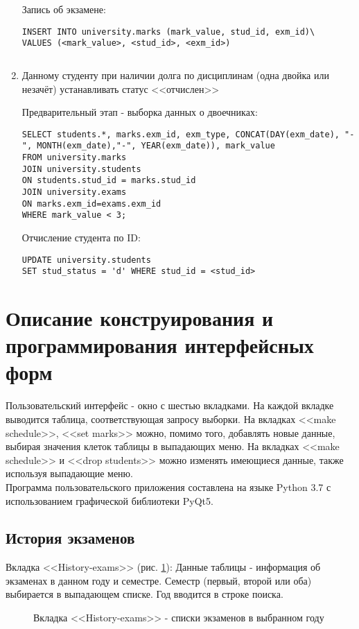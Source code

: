 \documentclass[zuevDbReport.tex]{subfiles}
\begin{document}
\begin{enumerate}
Запись об экзамене:

\begin{lstlisting}
INSERT INTO university.marks (mark_value, stud_id, exm_id)\
VALUES (<mark_value>, <stud_id>, <exm_id>)
\end{lstlisting}

\begin{lstlisting}
\end{lstlisting}

\item{}Данному студенту при наличии долга по дисциплинам (одна двойка или незачёт) устанавливать статус <<отчислен>>\par

Предварительный этап - выборка данных о двоечниках:
\begin{lstlisting}
SELECT students.*, marks.exm_id, exm_type, CONCAT(DAY(exm_date), "-", MONTH(exm_date),"-", YEAR(exm_date)), mark_value
FROM university.marks
JOIN university.students
ON students.stud_id = marks.stud_id
JOIN university.exams
ON marks.exm_id=exams.exm_id
WHERE mark_value < 3;
\end{lstlisting}

Отчисление студента по ID:
\begin{lstlisting}
UPDATE university.students
SET stud_status = 'd' WHERE stud_id = <stud_id>
\end{lstlisting}

\end{enumerate}

\newpage
\section{Описание конструирования и программирования интерфейсных форм}
Пользовательский интерфейс - окно с шестью вкладками. На каждой вкладке выводится таблица, соответствующая запросу выборки. На вкладках <<make schedule>>, <<set marks>> можно, помимо того, добавлять новые данные, выбирая значения клеток таблицы в выпадающих меню. На вкладках <<make schedule>> и <<drop students>> можно изменять имеющиеся данные, также используя выпадающие меню.\\
Программа пользовательского приложения составлена на языке Python 3.7 с использованием графической библиотеки PyQt5.\\

\newpage
\subsection{История экзаменов}
\label{exmsHistSubsect}
Вкладка <<History-exams>> (рис. \ref{histExms}): Данные таблицы - информация об экзаменах в данном году и семестре. Семестр (первый, второй или оба) выбирается в выпадающем списке. Год вводится в строке поиска.
\begin{figure}[H]
\caption{Вкладка <<History-exams>> - списки экзаменов в выбранном году}
\label{histExms}
\end{figure}
\end{document}
